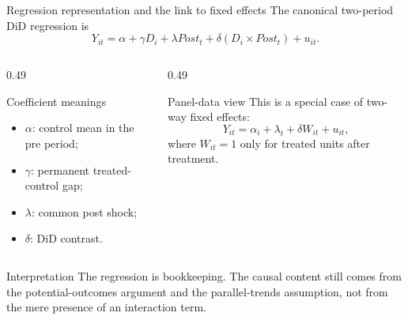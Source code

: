 \documentclass[10pt]{beamer}
\begin{document}
\begin{frame}{Regression representation and the link to fixed effects}
\label{slide:did_reg}
\small
The canonical two-period DiD regression is
\[
Y_{it} = \alpha + \gamma D_i + \lambda Post_t + \delta(D_i\times Post_t) + u_{it}.
\]

\begin{columns}[T]
\begin{column}{0.49\textwidth}
\begin{block}{Coefficient meanings}
\begin{itemize}
  \item $\alpha$: control mean in the pre period;
  \item $\gamma$: permanent treated-control gap;
  \item $\lambda$: common post shock;
  \item $\delta$: DiD contrast.
\end{itemize}
\end{block}
\end{column}
\begin{column}{0.49\textwidth}
\begin{block}{Panel-data view}
This is a special case of two-way fixed effects:
\[
Y_{it}=\alpha_i+\lambda_t+\delta W_{it}+u_{it},
\]
where $W_{it}=1$ only for treated units after treatment.
\end{block}
\end{column}
\end{columns}

\begin{exampleblock}{Interpretation}
The regression is bookkeeping. The causal content still comes from the potential-outcomes argument and the parallel-trends assumption, not from the mere presence of an interaction term.
\end{exampleblock}

\hfill\hyperlink{app:did-reg}{}
\end{frame}
\end{document}
